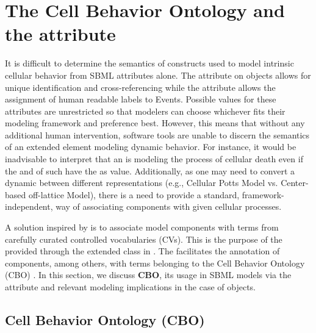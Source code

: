 
\section{The Cell Behavior Ontology and the  attribute}
\label{sec:CBO}

It is difficult to determine the semantics of \Event constructs used to model intrinsic cellular behavior from SBML attributes alone. The  attribute on \Event objects allows for unique identification and cross-referencing while the  attribute allows the assignment of human readable labels to Events. Possible values for these attributes are unrestricted so that modelers can choose whichever fits their modeling framework and preference best. However, this means that without any additional human intervention, software tools are unable to discern the semantics of an extended \Event element modeling dynamic behavior. For instance, it would be inadvisable to interpret that an \Event is modeling the process of cellular death even if the  and  of such \Event have the   as value. Additionally, as one may need to convert a dynamic \Event between different representations (e.g., Cellular Potts Model vs. Center-based off-lattice Model), there is a need to provide a standard, framework-independent, way of associating \Event components with given cellular processes.

A solution inspired by \sbmlthreecore is to associate model components with terms from carefully curated controlled vocabularies (CVs). This is the purpose of the  provided through the extended \SBase class in . The  facilitates the annotation of \Event components, among others, with terms belonging to the Cell Behavior Ontology (CBO) \citep{Sluka2014}. In this section, we discuss \textbf{CBO}, its usage in SBML models via the  attribute and relevant modeling implications in the case of \Event objects.

\subsection{Cell Behavior Ontology (CBO)}
\label{subsec:bioCBO}

